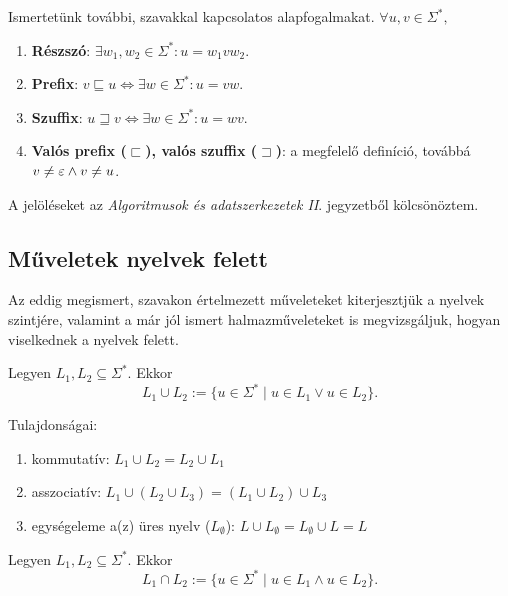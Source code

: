 Ismertetünk további, szavakkal kapcsolatos alapfogalmakat. $\forall u, v \in \Sigma^*,$

\begin{enumerate}
	\item \textbf{Részszó}: $\exists w_1, w_2 \in \Sigma^* : u = w_1 v w_2$.
	\item \textbf{Prefix}: $v \sqsubseteq u \Longleftrightarrow \exists w \in \Sigma^* : u = vw$.
	\item \textbf{Szuffix}: $u \sqsupseteq v \Longleftrightarrow \exists w \in \Sigma^* : u = wv$.
	\item \textbf{Valós prefix ($\sqsubset$), valós szuffix ($\sqsupset$)}: a megfelelő definíció, továbbá $v \neq \varepsilon \land v \neq u$.
\end{enumerate}

A jelöléseket az \textit{Algoritmusok és adatszerkezetek II}. jegyzetből kölcsönöztem.

\subsection{Műveletek nyelvek felett}

Az eddig megismert, szavakon értelmezett műveleteket kiterjesztjük a nyelvek szintjére, valamint a már jól ismert halmazműveleteket is megvizsgáljuk, hogyan viselkednek a nyelvek felett.

\begin{tcolorbox}
	\begin{definition}[Unió]
		Legyen $L_1, L_2 \subseteq \Sigma^*$. Ekkor \[ L_1 \cup L_2 := \{ u \in \Sigma^* \mid u \in L_1 \lor u \in L_2 \}. \]
	\end{definition}
\end{tcolorbox}

Tulajdonságai:

\begin{enumerate}
	\item kommutatív: $L_1 \cup L_2 = L_2 \cup L_1$
	\item asszociatív: $L_1 \cup (L_2 \cup L_3) = (L_1 \cup L_2) \cup L_3$
	\item egységeleme a(z) üres nyelv ($L_\emptyset$): $L \cup L_\emptyset = L_\emptyset \cup L = L$
\end{enumerate}

\begin{tcolorbox}
	\begin{definition}[Metszet]
		Legyen $L_1, L_2 \subseteq \Sigma^*$. Ekkor \[ L_1 \cap L_2 := \{ u \in \Sigma^* \mid u \in L_1 \land u \in L_2 \}. \]
	\end{definition}
\end{tcolorbox}

